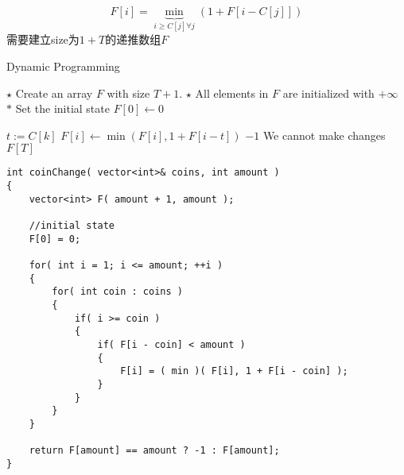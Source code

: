 \[
F[i] = \underbrace{\min}_{i \geq C[j]\forall j}(1+F[i-C[j]])
\]
需要建立size为$ 1+T $的递推数组$F$
\setcounter{algorithm}{0}
\begin{algorithm}[H]
\caption{Dynamic Programming}
\begin{algorithmic}[1]
\State $\star$ Create an array $F$ with size $T+1$.
\State $\star$ All elements in $F$ are initialized with $+\infty$
\State $\ast$ Set the initial state
\State $F[0]\gets 0$
\end{algorithmic}
\end{algorithm}
\begin{algorithm}[H]
\begin{algorithmic}[1]
\State $t:=C[k]$
\State $F[i]\gets \min(F[i], 1+F[i-t])$
\EndIf
\EndFor
\EndFor
{}
\State \Return $ -1 $ \Comment We cannot make changes
\Else
\State \Return $F[T]$
\EndIf
\EndProcedure
\end{algorithmic}
\end{algorithm}
\setcounter{lstlisting}{0}
\begin{lstlisting}[style=customc, caption={Dynamic Programming}]
int coinChange( vector<int>& coins, int amount )
{
    vector<int> F( amount + 1, amount );

	//initial state
    F[0] = 0;
    
    for( int i = 1; i <= amount; ++i )
    {
        for( int coin : coins )
        {
            if( i >= coin )
            {
                if( F[i - coin] < amount )
                {
                    F[i] = ( min )( F[i], 1 + F[i - coin] );
                }
            }
        }
    }

    return F[amount] == amount ? -1 : F[amount];
}
\end{lstlisting}